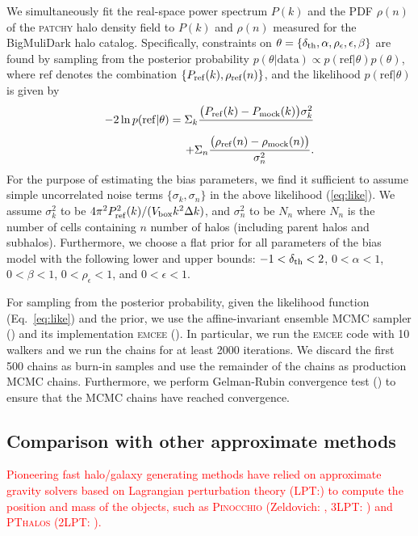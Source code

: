 \documentclass[english,usenatbib]{mn2e}
\newcommand{\tod}[1]{{\textcolor{red}{ #1}}}
\newcommand{\ba}{\begin{eqnarray}}
\newcommand{\ea}{\end{eqnarray}}
\begin{document}
We simultaneously fit the real-space power spectrum $P(k)$ and the PDF $\rho(n)$ of the \textsc{patchy} halo density field to $P(k)$ and $\rho(n)$ measured for the BigMuliDark halo catalog. Specifically, constraints on $\theta = \{\delta_{\rm th},\alpha, \rho_{\epsilon},\epsilon, \beta\}$ are found by sampling from the posterior probability $p(\theta|\mathrm{data}) \propto p(\mathrm{ref}|\theta)p(\theta)$, where $\mathrm{ref}$ denotes the combination $\{P_{\rm ref} (k), \rho_{\rm ref}(n)\}$, and the likelihood $p(\mathrm{ref}|\theta)$ is given by
\ba
-2\ln p(\mathrm{ref}|\theta) = \Sigma_{k}\frac{\big(P_{\rm ref}(k)-P_{\rm mock}(k)\big){\sigma^{2}_{k}}} \nonumber \\
+ \Sigma_{n}\frac{\big(\rho_{\rm ref}(n)-\rho_{\rm mock}(n)\big)}{\sigma^{2}_{n}}.
\label{eq:like}
\ea
For the purpose of estimating the bias parameters, we find it sufficient to assume simple uncorrelated noise terms $\{\sigma_{k},\sigma_{n}\}$ in the above likelihood (\ref{eq:like}). We assume $\sigma_{k}^{2}$ to be $4\pi^{2} P_{\rm ref}^{2}(k)/(V_{\rm box}k^{2}\Delta k)$, and $\sigma_n^{2}$ to be $N_n$ where $N_n$ is the number of cells containing $n$ number of halos (including parent halos and subhalos). Furthermore, we choose a flat prior for all parameters of the bias model with the following lower and upper bounds: $-1<\delta_{\rm th}<2$, $0<\alpha<1$, $0<\beta<1$, $0<\rho_{\epsilon}<1$, and $0<\epsilon<1$.

For sampling from the posterior probability, given the likelihood function (Eq.~\ref{eq:like}) and the prior, we use the affine-invariant ensemble MCMC sampler (\citealt{goodmanweare}) and its implementation \textsc{emcee} (\citealt{emcee}). In particular, we run the \textsc{emcee} code with 10 walkers and we run the chains for at least 2000 iterations. We discard the first 500 chains as burn-in samples and use the remainder of the chains as production MCMC chains. Furthermore, we perform Gelman-Rubin convergence test (\citealt{grtest}) to ensure that the MCMC chains have reached convergence.

\subsection{Comparison with other approximate methods}

\tod{Pioneering fast halo/galaxy generating methods have relied on approximate gravity solvers based on Lagrangian perturbation theory (LPT:\citealt{buchert1993,bouchet1995,catelan1995,scocci2002}) to compute the position and mass of the objects, such as \textsc{Pinocchio} (Zeldovich: \citealt{monaco2002,monaco2013}, 3LPT: \citealt{monaco2016}) and \textsc{PThalos} (2LPT: \citealt{pthalo,manera2015}).}
\end{document}
